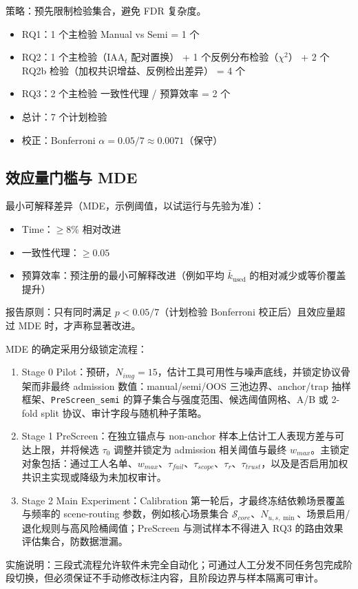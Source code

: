 策略：预先限制检验集合，避免 FDR 复杂度。
\begin{itemize}
    \item RQ1：1 个主检验 Manual vs Semi = 1 个
    \item RQ2：1 个主检验（$\mathrm{IAA}_t$ 配对置换） + 1 个反例分布检验（$\chi^2$） + 2 个 RQ2b 检验（加权共识增益、反例检出差异） = 4 个
    \item RQ3：2 个主检验 一致性代理 / 预算效率 = 2 个
    \item 总计：7 个计划检验
    \item 校正：Bonferroni $\alpha = 0.05/7 \approx 0.0071$（保守）
\end{itemize}
\subsection{效应量门槛与 MDE}

最小可解释差异（MDE，示例阈值，以试运行与先验为准）：
\begin{itemize}
    \item Time：$\geq8\%$ 相对改进
    \item 一致性代理：$\geq0.05$
    \item 预算效率：预注册的最小可解释改进（例如平均 $\bar{k}_{\mathrm{used}}$ 的相对减少或等价覆盖提升）
\end{itemize}

报告原则：只有同时满足 $p<0.05/7$（计划检验 Bonferroni 校正后）且效应量超过 MDE 时，才声称显著改进。

MDE 的确定采用分级锁定流程：
\begin{enumerate}
    \item Stage 0 Pilot：预研，$N_{img}=15$，估计工具可用性与噪声底线，并锁定协议骨架而非最终 admission 数值：manual/semi/OOS 三池边界、anchor/trap 抽样框架、\texttt{PreScreen\_semi} 的算子集合与强度范围、候选阈值网格、A/B 或 2-fold split 协议、审计字段与随机种子策略。
    \item Stage 1 PreScreen：在独立锚点与 non-anchor 样本上估计工人表现方差与可达上限，并将候选 $\tau_0$ 调整并锁定为 admission 相关阈值与最终 $w_{max}$。主锁定对象包括：通过工人名单、$w_{max}$、$\tau_{fail}$、$\tau_{scope}$、$\tau_r$、$\tau_{trust}$，以及是否启用加权共识主实现或降级为未加权审计。
    \item Stage 2 Main Experiment：Calibration 第一轮后，才最终冻结依赖场景覆盖与频率的 scene-routing 参数，例如核心场景集合 $\mathcal{S}_{core}$、$N_{u,s,\min}$、场景启用/退化规则与高风险桶阈值；PreScreen 与测试样本不得进入 RQ3 的路由效果评估集合，防数据泄漏。
\end{enumerate}

实施说明：三段式流程允许软件未完全自动化；可通过人工分发不同任务包完成阶段切换，但必须保证不手动修改标注内容，且阶段边界与样本隔离可审计。


